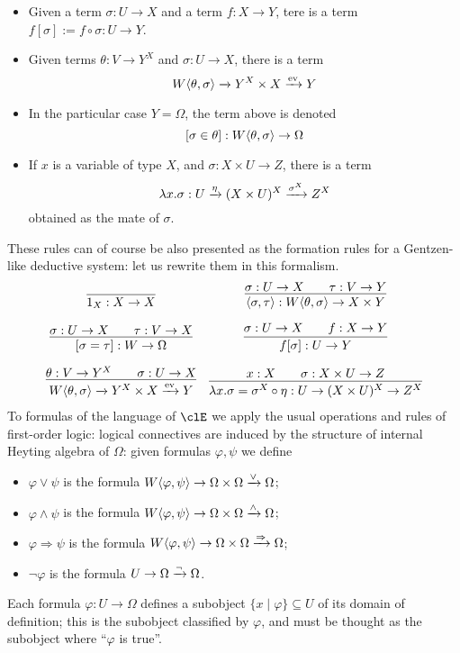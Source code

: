 \begin{definition}
\begin{itemize}
	\item Given a term $\sigma : U \to X$ and a term $f : X \to Y$, tere is a term $f[\sigma] := f\circ\sigma : U \to Y$.
	\item Given terms $\theta :  V \to Y^X$ and $\sigma : U\to X$, there is a term
	      \[
		      W\langle \theta,\sigma\rangle \xrightarrow{}Y^X\times X \xrightarrow{\text{ev}} Y
	      \]
	\item In the particular case $Y=\Omega$, the term above is denoted
	      \[[\sigma\in\theta] : W\langle \theta,\sigma\rangle \to \Omega\]
	\item If $x$ is a variable of type $X$, and $\sigma : X\times U \to Z$, there is a term
	      \[\lambda x.\sigma : U \xrightarrow{\eta} (X\times U)^X \xrightarrow{\sigma^X} Z^X\]
	      obtained as the mate of $\sigma$.
\end{itemize}
These rules can of course be also presented as the formation rules for a Gentzen-like deductive system: let us rewrite them in this formalism.
\[ \begin{array}{cc}
		\infer{1_X : X \to X}{}                                                              &
		\infer{\lr{\sigma}{\tau} : W\lr{\theta}{\sigma} \to X \times Y }{\sigma : U \to X    &   & \tau : V \to Y}             \\[1em]
		\infer{[\sigma=\tau] : W \to \Omega}{\sigma : U \to X                                &   & \tau : V \to X}           &
		\infer{f[\sigma] : U \to Y}{\sigma : U \to X                                         &   & f : X \to Y}                \\[1em]
		\infer{W\lr{\theta}{\sigma} \xto{}Y^X\times X \xto{\text{ev}} Y}{\theta :  V \to Y^X &   & \sigma : U\to X}          &
		\infer{\lambda x.\sigma = \sigma^X\circ\eta : U \to (X\times U)^X \to Z^X}{ x: X     &   & \sigma : X\times U \to Z}
	\end{array}\]
To formulas of the language of $\clE$ we apply the usual operations and rules of first-order logic: logical connectives are induced by the structure of internal Heyting algebra of $\Omega$: given formulas $\varphi,\psi$ we define
\begin{itemize}
	\item $\varphi\lor \psi$ is the formula $W\langle \varphi,\psi\rangle \to \Omega\times \Omega \xrightarrow{\lor} \Omega$;
	\item $\varphi\land\psi$ is the formula $W\langle \varphi,\psi\rangle \to \Omega\times \Omega \xrightarrow{\land} \Omega$;
	\item $\varphi\Rightarrow\psi$ is the formula $W\langle \varphi,\psi\rangle \to \Omega\times \Omega \xrightarrow{\Rightarrow} \Omega$;
	\item $\lnot\varphi$ is the formula $U \to \Omega \xrightarrow{\lnot} \Omega$.
\end{itemize} 
\end{definition}
Each formula $\varphi : U \to \Omega$ defines a subobject $\{x\mid \varphi\} \subseteq U$ of its domain of definition; this is the subobject classified by $\varphi$, and must be thought as the subobject where ``$\varphi$ is true''.

